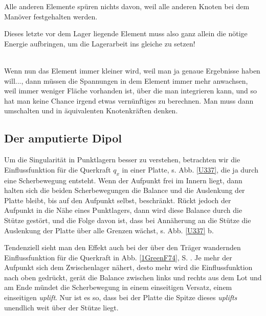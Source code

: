 {{{{{{Alle anderen Elemente sp\"{u}ren nichts davon, weil alle anderen Knoten bei dem Man\"{o}ver festgehalten werden. \\

\hspace*{-12pt}\colorbox{highlightBlue}{\parbox{0.98\textwidth}{Dieses letzte vor dem Lager liegende Element muss also ganz allein die n\"{o}tige Energie aufbringen, um die Lagerarbeit ins gleiche zu setzen!}}\\

Wenn nun das Element immer kleiner wird, weil man ja genaue Ergebnisse haben will..., dann m\"{u}ssen die Spannungen in dem Element immer mehr anwachsen, weil immer weniger Fl\"{a}che vorhanden ist, \"{u}ber die man integrieren kann, und so hat man keine Chance irgend etwas vern\"{u}nftiges zu berechnen. Man muss dann umschalten und in \"{a}quivalenten Knotenkr\"{a}ften denken.

{\textcolor{sectionTitleBlue}{\section{Der amputierte Dipol}}}\label{Korrektur22}
Um die Singularit\"{a}t in Punktlagern besser zu verstehen, betrachten wir die Einflussfunktion f\"{u}r die Querkraft $q_x$ in einer Platte, s. Abb. \ref{U337}, die ja durch eine Scherbewegung entsteht. Wenn der Aufpunkt frei im Innern liegt, dann halten sich die beiden Scherbewegungen die Balance und die Auslenkung der Platte bleibt, bis auf den Aufpunkt selbst, beschr\"{a}nkt. R\"{u}ckt jedoch der Aufpunkt in die N\"{a}he eines Punktlagers, dann wird diese Balance durch die St\"{u}tze gest\"{o}rt, und die Folge davon ist, dass bei Ann\"{a}herung an die St\"{u}tze die Auslenkung der Platte \"{u}ber alle Grenzen w\"{a}chst, s. Abb. \ref{U337} b.

Tendenziell sieht man den Effekt auch bei der \"{u}ber den Tr\"{a}ger wandernden Einflussfunktion f\"{u}r die Querkraft in Abb. \ref{1GreenF74}, S. \pageref{1GreenF74}. Je mehr der Aufpunkt sich dem Zwischenlager n\"{a}hert, desto mehr wird die Einflussfunktion nach oben gedr\"{u}ckt, ger\"{a}t die Balance zwischen links und rechts aus dem Lot und am Ende m\"{u}ndet die Scherbewegung in einem einseitigen Versatz, einem einseitigen {\em uplift\/}. Nur ist es so, dass bei der Platte die Spitze dieses {\em uplifts\/} unendlich weit \"{u}ber der St\"{u}tze liegt.

}}}}}}
